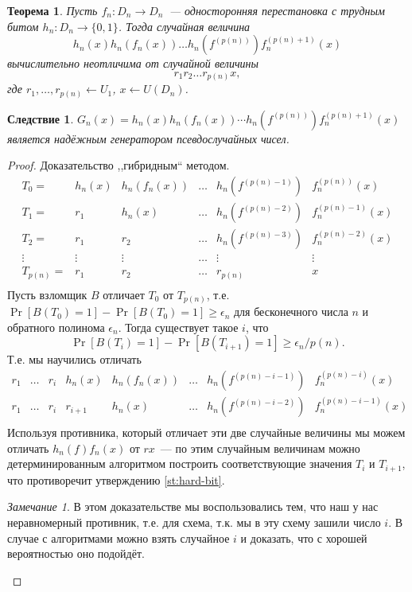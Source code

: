 \documentclass[12pt,a4paper]{article}
\newcommand{\bits}{\{0,1\}}
\theoremstyle{definition}
\theoremstyle{plain}
\newtheorem{theorem}{Теорема}[section]
\newtheorem{corollary}{Следствие}[section]
\theoremstyle{remark}
\newtheorem{remark}{Замечание}[section]
\begin{document}
\begin{theorem}
Пусть $f_n:D_n\to D_n$~--- односторонняя перестановка с трудным битом $h_n: D_n\to\bits$.
Тогда случайная величина 
$$h_n(x)h_n(f_n(x))\dotsc h_n(f^{(p(n))})f_n^{(p(n) + 1)}(x)$$
вычислительно неотличима от случайной величины 
$$r_1r_2\dotsc r_{p(n)}x,$$
где $r_1,\dotsc,r_{p(n)}\gets U_1$, $x\gets U(D_n)$.
\end{theorem}
\begin{corollary}
$G_n(x) = h_n(x)h_n(f_n(x))\dotsb h_n(f^{(p(n))})f_n^{(p(n) + 1)}(x)$ является надёжным генератором псевдослучайных чисел.
\end{corollary}
\begin{proof}
Доказательство ,,гибридным`` методом.
$$
\begin{array}{llllll}
T_0 = & h_n(x)&h_n(f_n(x))&\dotsc  &h_n(f^{(p(n)-1)})  &f_n^{(p(n))}(x)\\
T_1 = &r_1   &h_n(x)     &\dotsc  &h_n(f^{(p(n)-2)})&f_n^{(p(n)-1)}(x)\\
T_2 = &r_1   &r_2        &\dotsc  &h_n(f^{(p(n)-3)})&f_n^{(p(n)-2)}(x)\\
\vdots   &\vdots&\vdots     &\dotsc  &\vdots			 &\vdots\\
T_{p(n)}= &r_1   &r_2        &\dotsc  &r_{p(n)}		 &x\\
\end{array}
$$
Пусть взломщик $B$ отличает $T_0$ от $T_{p(n)}$, т.е. $\Pr[B(T_0) = 1] - \Pr[B(T_0) = 1]\ge\epsilon_n$
для бесконечного числа $n$ и обратного полинома $\epsilon_n$. Тогда существует такое $i$, что
$$\Pr[B(T_i) = 1] - \Pr[B(T_{i+1}) = 1]\ge\epsilon_n/p(n).$$ Т.е. мы научились отличать
$$
\begin{array}{llllllll}
r_1   &\dotsc & r_i & h_n(x)  & h_n(f_n(x)) &\dotsc& h_n(f^{(p(n)-i - 1)})    &f_n^{(p(n) - i)}(x)\\
r_1   &\dotsc & r_i & r_{i+1} & h_n(x)      &\dotsc& h_n(f^{(p(n)-i - 2)})&f_n^{(p(n) - i - 1)}(x)\\
\end{array}
$$
Используя противника, который отличает эти две случайные величины мы можем отличать $h_n(f)f_n(x)$ от $r x$~---
по этим случайным величинам можно детерминированным алгоритмом построить соответствующие значения $T_{i}$ и $T_{i+1}$, что противоречит утверждению \ref{st:hard-bit}.

\begin{remark}
В этом доказательстве мы воспользовались тем, что наш у нас неравномерный противник, т.е. для схема,
т.к. мы в эту схему зашили число $i$. В случае с алгоритмами можно взять случайное $i$ и доказать, 
что с хорошей вероятностью оно подойдёт.
\end{remark}
\end{proof}
\end{document}
